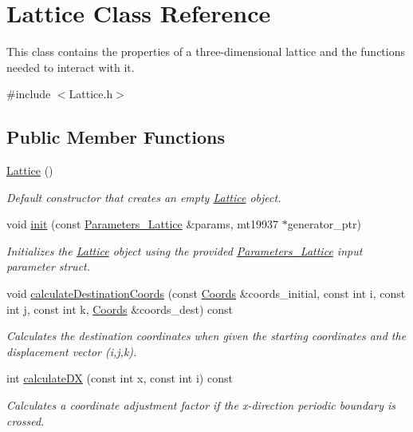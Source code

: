 \hypertarget{class_lattice}{}\section{Lattice Class Reference}
\label{class_lattice}


This class contains the properties of a three-\/dimensional lattice and the functions needed to interact with it.  




{\ttfamily \#include $<$Lattice.\+h$>$}

\subsection*{Public Member Functions}
\begin{DoxyCompactItemize}
\item 
\hyperlink{class_lattice_a70a5cebc3c0c5a0f609be0592e7cc117}{Lattice} ()
\begin{DoxyCompactList}\small\item\em Default constructor that creates an empty \hyperlink{class_lattice}{Lattice} object. \end{DoxyCompactList}\item 
void \hyperlink{class_lattice_a4067a9617cc24fa60ca6b47fccb4c123}{init} (const \hyperlink{struct_parameters___lattice}{Parameters\+\_\+\+Lattice} \&params, mt19937 $\ast$generator\+\_\+ptr)
\begin{DoxyCompactList}\small\item\em Initializes the \hyperlink{class_lattice}{Lattice} object using the provided \hyperlink{struct_parameters___lattice}{Parameters\+\_\+\+Lattice} input parameter struct. \end{DoxyCompactList}\item 
void \hyperlink{class_lattice_aa6b80d6264bfc23ae5fea39abd2557d5}{calculate\+Destination\+Coords} (const \hyperlink{struct_coords}{Coords} \&coords\+\_\+initial, const int i, const int j, const int k, \hyperlink{struct_coords}{Coords} \&coords\+\_\+dest) const
\begin{DoxyCompactList}\small\item\em Calculates the destination coordinates when given the starting coordinates and the displacement vector (i,j,k). \end{DoxyCompactList}\item 
int \hyperlink{class_lattice_a08adb2f412af409d3ec241e60e687c1a}{calculate\+DX} (const int x, const int i) const
\begin{DoxyCompactList}\small\item\em Calculates a coordinate adjustment factor if the x-\/direction periodic boundary is crossed. \end{DoxyCompactList}\item 

\end{DoxyCompactItemize}
